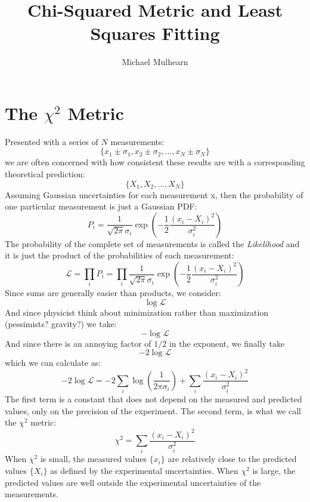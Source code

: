 \documentclass[12pt]{article}
\begin{document}
\title{Chi-Squared Metric and Least Squares Fitting}
\author{Michael Mulhearn}

\maketitle

\section{The $\chi^2$ Metric}
Presented with a series of $N$ measurements:
\begin{displaymath}
\{x_1 \pm \sigma_1, x_2 \pm \sigma_2, ..., x_N \pm \sigma_N\}
\end{displaymath}
we are often concerned with how consistent these results are with a corresponding theoretical prediction:
\begin{displaymath}
\{X_1, X_2, ..., X_N\}
\end{displaymath}
Assuming Gaussian uncertainties for each measurement x, then the probability of one particular measurement is just a Gaussian PDF:
\begin{displaymath}
P_i = \frac{1}{\sqrt{2\pi} \sigma_i} \exp\left(-\frac{1}{2} \frac{(x_i-X_i)^2}{\sigma_i^2}\right)
\end{displaymath}
The probability of the complete set of measurements is called the {\em Likelihood} and it is just the product of the probabilities of each measurement:
\begin{displaymath}
\mathcal{L} = \prod_i P_i = \prod_i \frac{1}{\sqrt{2\pi} \sigma_i} \exp\left(-\frac{1}{2} \frac{(x_i-X_i)^2}{\sigma_i^2}\right)
\end{displaymath}
Since sums are generally easier than products, we consider:
\begin{displaymath}
\log \mathcal{L}
\end{displaymath}
And since physicist think about minimization rather than maximization (pessimists?  gravity?) we take:
\begin{displaymath}
-\log \mathcal{L}
\end{displaymath}
And since there is an annoying factor of $1/2$ in the exponent, we finally take
\begin{displaymath}
-2 \log \mathcal{L}
\end{displaymath}
which we can calculate as:
\begin{displaymath}
-2 \log \mathcal{L} = -2 \sum_i \log\left( \frac{1}{2 \pi \sigma_i }\right) + \sum_i \frac{(x_i-X_i)^2}{\sigma_i^2}
\end{displaymath}
The first term is a constant that does not depend on the measured and predicted values, only on the precision of the experiment.  The second term, is what we call the $\chi^2$ metric:
\begin{equation}
\chi^2 = \sum_i \frac{(x_i-X_i)^2}{\sigma_i^2}
\end{equation}
When $\chi^2$ is small, the measured values $\{x_i\}$ are relatively close to the predicted values $\{X_i\}$ as defined by the experimental uncertainties.  When $\chi^2$ is large, the predicted values are well outside the experimental uncertainties of the measurements.
\end{document}
